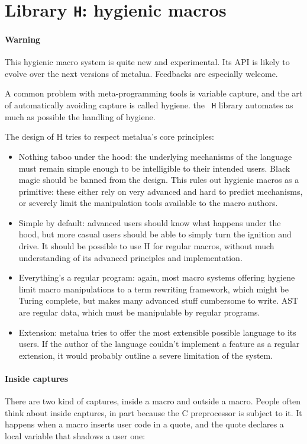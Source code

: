 \section{Library {\tt H}: hygienic macros}

\paragraph{Warning} This hygienic macro system is quite new and
experimental. Its API is likely to evolve over the next versions of
metalua. Feedbacks are especially welcome.

A common problem with meta-programming tools is variable capture, and
the art of automatically avoiding capture is called hygiene. the {\tt
  H} library automates as much as possible the handling of hygiene.

The design of H tries to respect metalua's core principles:
\begin{itemize}
\item Nothing taboo under the hood: the underlying mechanisms of the
  language must remain simple enough to be intelligible to their
  intended users. Black magic should be banned from the design. This
  rules out hygienic macros as a primitive: these either rely on very
  advanced and hard to predict mechanisms, or severely limit the
  manipulation tools available to the macro authors.
\item Simple by default: advanced users should know what happens under
  the hood, but more casual users should be able to simply turn the
  ignition and drive. It should be possible to use H for regular
  macros, without much understanding of its advanced principles and
  implementation.
\item Everything's a regular program: again, most macro systems
  offering hygiene limit macro manipulations to a term rewriting
  framework, which might be Turing complete, but makes many advanced
  stuff cumbersome to write. AST are regular data, which must be
  manipulable by regular programs.
\item Extension: metalua tries to offer the most extensible possible
  language to its users. If the author of the language couldn't
  implement a feature as a regular extension, it would probably
  outline a severe limitation of the system.
\end{itemize}

\paragraph{Inside captures}
There are two kind of captures, inside a macro and outside a
macro. People often think about inside captures, in part because the
C preprocessor is subject to it. It happens when a macro inserts user
code in a quote, and the quote declares a local variable that shadows
a user one:

